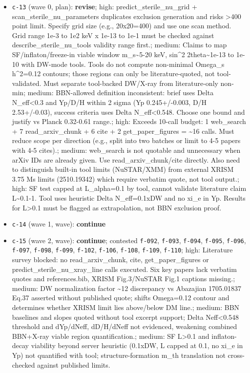 \documentclass[11pt,a4paper]{article}
\begin{document}
\begin{itemize}
  \item \texttt{c-13} (wave 0, plan): \textbf{revise}; high: predict\_sterile\_nu\_grid + scan\_sterile\_nu\_parameters duplicates exclusion generation and risks \textgreater{}400 point limit. Specify grid size (e.g., 20x20=400) and use one scan method. Grid range 1e-3 to 1e2 keV x 1e-13 to 1e-1 must be checked against describe\_sterile\_nu\_tools validity range first.; medium: Claims to map SF/inflaton/freeze-in viable window m\_s\textasciitilde{}5-20 keV, sin\textasciicircum{}2 2theta\textasciitilde{}1e-13 to 1e-10 with DW-mode tools. Tools do not compute non-minimal Omega\_s h\textasciicircum{}2=0.12 contours; those regions can only be literature-quoted, not tool-validated. Must separate tool-backed DW/X-ray from literature-only non-min; medium: BBN-allowed definition inconsistent: brief uses Delta N\_eff\textless{}0.3 and Yp/D/H within 2 sigma (Yp 0.245+/-0.003, D/H 2.53+/-0.03), success criteria uses Delta N\_eff\textless{}0.548. Choose one bound and justify vs Planck 0.32-0.61 range.; high: Exceeds 10-call budget: 1 web\_search + 7 read\_arxiv\_chunk + 6 cite + 2 get\_paper\_figures = \textasciitilde{}16 calls. Must reduce scope per direction (e.g., split into two batches or limit to 4-5 papers with 4-5 cites).; medium: web\_search is not quotable and unnecessary when arXiv IDs are already given. Use read\_arxiv\_chunk/cite directly. Also need to distinguish built-in tool limits (NuSTAR/XMM) from external XRISM 3.75 Ms limits (2510.19342) which require verbatim quote, not tool output.; high: SF test capped at L\_alpha=0.1 by tool, cannot validate literature claim L\textasciitilde{}0.1-1. Tool uses heuristic Delta N\_eff=0.1xDW and no xi\_e in Yp. Results for L\textgreater{}0.1 must be flagged as extrapolation, not BBN exclusion proof.
  \item \texttt{c-14} (wave 1, wave): \textbf{continue}
  \item \texttt{c-15} (wave 2, wave): \textbf{continue}; contested \texttt{f-092}, \texttt{f-093}, \texttt{f-094}, \texttt{f-095}, \texttt{f-096}, \texttt{f-097}, \texttt{f-098}, \texttt{f-099}, \texttt{f-102}, \texttt{f-106}, \texttt{f-108}, \texttt{f-109}, \texttt{f-110}; high: Literature survey blocked: no read\_arxiv\_chunk, cite, get\_paper\_figures or predict\_sterile\_nu\_xray\_line calls executed. Six key papers lack verbatim quotes and references.bib, XRISM Fig.3/NuSTAR Fig.1 captions missing.; medium: DW normalization factor \textasciitilde{}12 discrepancy vs Abazajian 1705.01837 Eq.37 asserted without published quote; shifts Omega=0.12 contour and determines whether XRISM limit lies above/below DM line.; medium: BBN baselines and slopes quoted without tool excerpt support; Delta Neff\textless{}0.548 threshold and dYp/dNeff, dD/H/dNeff not evidenced, weakening combined BBN+X-ray viable region quantification.; medium: SF L\textgreater{}0.1 and inflaton-decay viability beyond server heuristic (0.1xDW, L capped at 0.1, no xi\_e in Yp) not quantified with tool; structure-formation m\_th translation not cross-checked against published limits.

\end{itemize}
\end{document}

